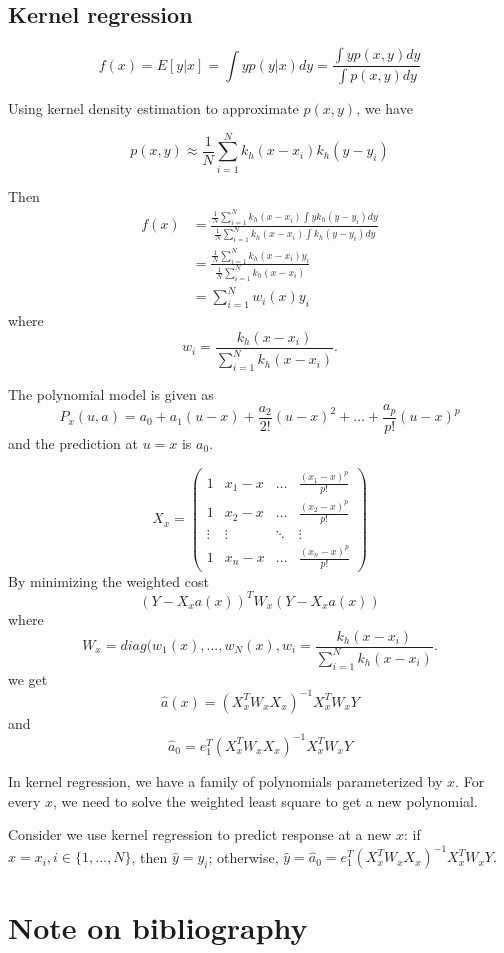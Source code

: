 \begin{refsection}
\subsection{Kernel regression}
$$f(x) = E[y|x] = \int y p(y|x) dy = \frac{\int y p(x,y)dy}{\int p(x,y)dy}$$

Using kernel density estimation to approximate $p(x,y)$, we have

$$p(x,y) \approx \frac{1}{N} \sum_{i=1}^N k_h(x-x_i)k_h(y-y_i)$$

Then
\begin{align*}
f(x) &= \frac{\frac{1}{N} \sum_{i=1}^N k_h(x-x_i)\int yk_h(y-y_i)dy}{\frac{1}{N} \sum_{i=1}^N k_h(x-x_i)\int k_h(y-y_i)dy}\\
&= \frac{\frac{1}{N} \sum_{i=1}^N k_h(x-x_i)y_i}{\frac{1}{N} \sum_{i=1}^N k_h(x-x_i)}\\
&=\sum_{i=1}^N w_i(x)y_i
\end{align*}
where
$$w_i = \frac{k_h(x-x_i)}{ \sum_{i=1}^N k_h(x-x_i)}.$$



The polynomial model is given as
$$P_x(u,a) = a_0 + a_1(u-x) + \frac{a_2}{2!}(u-x)^2 + ... + \frac{a_p}{p!}(u-x)^p$$
and the prediction at $u=x$ is $a_0$.


$$X_x = \begin{pmatrix}
1 & x_1-x & \dots & \frac{(x_1-x)^p}{p!}\\ 
1 & x_2-x & \dots & \frac{(x_2-x)^p}{p!}\\ 
\vdots & \vdots & \ddots & \vdots \\ 
1 & x_n-x & \dots & \frac{(x_n-x)^p}{p!}
\end{pmatrix}$$
By minimizing the weighted cost
$$(Y-X_x a(x))^TW_x(Y - X_x a(x))$$
where $$W_x = diag(w_1(x),...,w_N(x),w_i = \frac{k_h(x-x_i)}{ \sum_{i=1}^N k_h(x-x_i)}.$$
we get
$$\hat{a}(x) = (X_x^TW_xX_x)^{-1}X_x^TW_xY$$
and
$$\hat{a}_0 = e_1^T(X_x^TW_xX_x)^{-1}X_x^TW_xY$$


\begin{remark}[interpretation]
In kernel regression, we have a family of polynomials parameterized by $x$. For every $x$, we need to solve the weighted least square to get a new polynomial.
\end{remark}

\begin{remark}\hfill
Consider we use kernel regression to predict response at a new $x$: if $x = x_i,i\in \{1,...,N\}$, then $\hat{y} = y_i$; otherwise, $\hat{y} = \hat{a}_0 = e_1^T(X_x^TW_xX_x)^{-1}X_x^TW_xY. $
\end{remark}



\section{Note on bibliography}


\printbibliography
\end{refsection}




